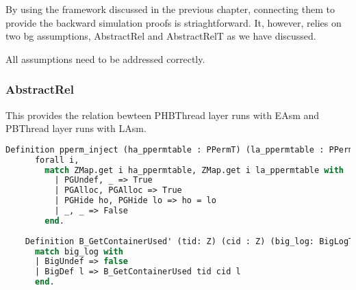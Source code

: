 By using the framework discussed in the previous chapter, connecting them to provide the backward simulation proofs is striaghtforward.
It, however, relies on two bg assumptions, 
AbstractRel and AbstractRelT as we have discussed. 

All assumptions need to be addressed correctly.

\subsubsection{AbstractRel}

This provides the relation bewteen PHBThread layer runs with EAsm and PBThread layer runs with LAsm. 

\begin{lstlisting}[language=Caml]
    Definition pperm_inject (ha_ppermtable : PPermT) (la_ppermtable : PPermT) : Prop := 
      forall i, 
        match ZMap.get i ha_ppermtable, ZMap.get i la_ppermtable with 
          | PGUndef, _ => True
          | PGAlloc, PGAlloc => True 
          | PGHide ho, PGHide lo => ho = lo
          | _, _ => False
        end.
    
    Definition B_GetContainerUsed' (tid: Z) (cid : Z) (big_log: BigLogType) : bool :=
      match big_log with 
      | BigUndef => false
      | BigDef l => B_GetContainerUsed tid cid l
      end.


\end{lstlisting}

